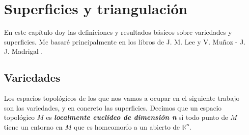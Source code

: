 \documentclass[10pt]{report}
\newcommand{\R}{\mathbb{R}}
\newcommand{\enfatiza}[1]{\textbf{\textit{#1}}}
\theoremstyle{definition}
\begin{document}
\chapter{Superficies y triangulación}
\setcounter{page}{1}
En este capítulo doy las definiciones y resultados básicos sobre variedades y superficies. Me basaré principalmente en los libros de J. M. Lee \cite{lee1} y V. Muñoz - J. J. Madrigal \cite{juanjo}.\\

\section{Variedades}\label{sec:variedades}
Los espacios topológicos de los que nos vamos a ocupar en el siguiente trabajo son las variedades, y en concreto las superficies. Decimos que un espacio topológico $M$ es \enfatiza{localmente euclídeo de dimensión n} si todo punto de $M$ tiene un entorno en $M$ que es homeomorfo a un abierto de $\R^n$.
\end{document}
